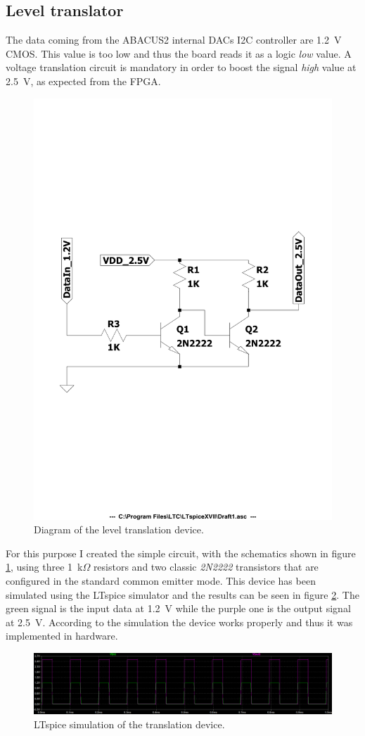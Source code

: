 \subsection{Level translator}\label{leveltranslator}
The data coming from the ABACUS2 internal DACs I2C controller are 1.2~V CMOS. This value is too low and thus the board reads it as a logic \textit{low} value. A voltage translation circuit is mandatory in order to boost the signal \textit{high} value at 2.5~V, as expected from the FPGA.
\begin{figure}[H]
	\centering
	\includegraphics[width=0.6\linewidth]{IMG/ch5/DIAGRAM}
	\caption{Diagram of the level translation device.}
	\label{fig:diagram}
\end{figure}
\noindent For this purpose I created the simple circuit, with the schematics shown in figure \ref{fig:diagram}, using three 1~k$\Omega$ resistors and two classic \textit{2N2222} transistors that are configured in the standard common emitter mode.
This device has been simulated using the LTspice simulator and the results can be seen in figure \ref{fig:transsimulation}.
The green signal is the input data at 1.2~V while the purple one is the output signal at 2.5~V.
According to the simulation the device works properly and thus it was implemented in hardware.
\begin{figure}[H]
	\centering
	\includegraphics[width=1\linewidth]{IMG/ch5/TRANSSIMULATION}
	\caption{LTspice simulation of the translation device.}
	\label{fig:transsimulation}
\end{figure}
